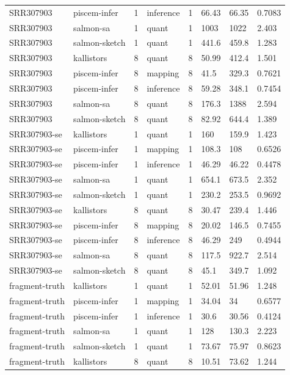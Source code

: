\begin{tabular}{llllllll}
SRR307903 & piscem-infer & 1 & inference & 1 & 66.43 & 66.35 & 0.7083 \\
SRR307903 & salmon-sa & 1 & quant & 1 & 1003 & 1022 & 2.403 \\
SRR307903 & salmon-sketch & 1 & quant & 1 & 441.6 & 459.8 & 1.283 \\
SRR307903 & kallistors & 8 & quant & 8 & 50.99 & 412.4 & 1.501 \\
SRR307903 & piscem-infer & 8 & mapping & 8 & 41.5 & 329.3 & 0.7621 \\
SRR307903 & piscem-infer & 8 & inference & 8 & 59.28 & 348.1 & 0.7454 \\
SRR307903 & salmon-sa & 8 & quant & 8 & 176.3 & 1388 & 2.594 \\
SRR307903 & salmon-sketch & 8 & quant & 8 & 82.92 & 644.4 & 1.389 \\
SRR307903-se & kallistors & 1 & quant & 1 & 160 & 159.9 & 1.423 \\
SRR307903-se & piscem-infer & 1 & mapping & 1 & 108.3 & 108 & 0.6526 \\
SRR307903-se & piscem-infer & 1 & inference & 1 & 46.29 & 46.22 & 0.4478 \\
SRR307903-se & salmon-sa & 1 & quant & 1 & 654.1 & 673.5 & 2.352 \\
SRR307903-se & salmon-sketch & 1 & quant & 1 & 230.2 & 253.5 & 0.9692 \\
SRR307903-se & kallistors & 8 & quant & 8 & 30.47 & 239.4 & 1.446 \\
SRR307903-se & piscem-infer & 8 & mapping & 8 & 20.02 & 146.5 & 0.7455 \\
SRR307903-se & piscem-infer & 8 & inference & 8 & 46.29 & 249 & 0.4944 \\
SRR307903-se & salmon-sa & 8 & quant & 8 & 117.5 & 922.7 & 2.514 \\
SRR307903-se & salmon-sketch & 8 & quant & 8 & 45.1 & 349.7 & 1.092 \\
fragment-truth & kallistors & 1 & quant & 1 & 52.01 & 51.96 & 1.248 \\
fragment-truth & piscem-infer & 1 & mapping & 1 & 34.04 & 34 & 0.6577 \\
fragment-truth & piscem-infer & 1 & inference & 1 & 30.6 & 30.56 & 0.4124 \\
fragment-truth & salmon-sa & 1 & quant & 1 & 128 & 130.3 & 2.223 \\
fragment-truth & salmon-sketch & 1 & quant & 1 & 73.67 & 75.97 & 0.8623 \\
fragment-truth & kallistors & 8 & quant & 8 & 10.51 & 73.62 & 1.244 \\

\end{tabular}
